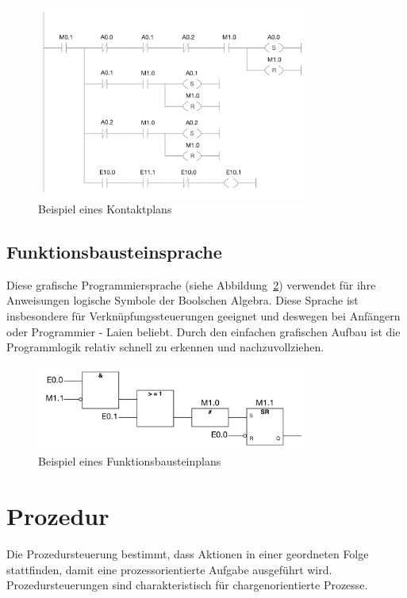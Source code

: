 	\begin{figure}[h!]
  		\centering
    	\includegraphics[width=0.8\textwidth]{graphics/stateoftheart/kop_Selfmade.png}
  		\caption{Beispiel eines Kontaktplans \cite{kontaktplan}}
  		\label{fig:kontaktplan}
	\end{figure}

	\subsection{Funktionsbausteinsprache}
	Diese grafische Programmiersprache (siehe Abbildung~\ref{fig:fup}) verwendet für ihre Anweisungen logische Symbole der Boolschen Algebra. Diese Sprache ist insbesondere für Verknüpfungssteuerungen geeignet und deswegen bei Anfängern oder Programmier - Laien beliebt. Durch den einfachen grafischen Aufbau ist die Programmlogik relativ schnell zu erkennen und nachzuvollziehen.

	\begin{figure}[h!]
  		\centering
    	\includegraphics[width=0.8\textwidth]{graphics/stateoftheart/funktionsbausteinplan_Selfmade.png}
  		\caption{Beispiel eines Funktionsbausteinplans \cite{funktionsbausteinplan}}
  		\label{fig:fup}
	\end{figure}

\section{Prozedur}
Die Prozedursteuerung bestimmt, dass Aktionen in einer geordneten Folge stattfinden, damit eine prozessorientierte Aufgabe ausgeführt wird. Prozedursteuerungen sind charakteristisch für chargenorientierte Prozesse.\\

